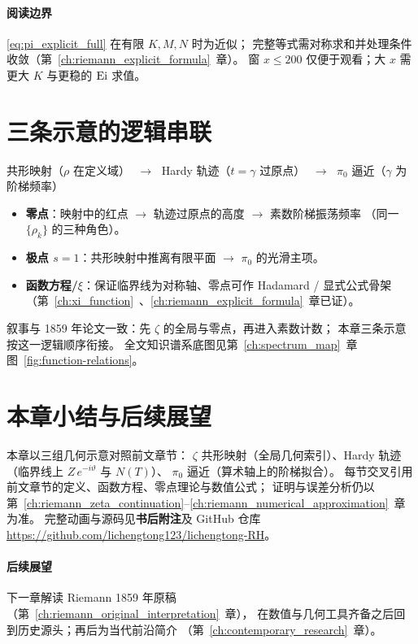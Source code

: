 \paragraph{阅读边界}
\eqref{eq:pi_explicit_full} 在有限 $K,M,N$ 时为近似；
完整等式需对称求和并处理条件收敛（第~\ref{ch:riemann_explicit_formula}~章）。
窗 $x\le 200$ 仅便于观看；大 $x$ 需更大 $K$ 与更稳的 $\operatorname{Ei}$ 求值。

\section{三条示意的逻辑串联}

\begin{center}
共形映射（$\rho$ 在定义域）
$\;\longrightarrow\;$
Hardy 轨迹（$t=\gamma$ 过原点）
$\;\longrightarrow\;$
$\pi_0$ 逼近（$\gamma$ 为阶梯频率）
\end{center}

\begin{itemize}
  \item \textbf{零点}：映射中的红点 $\to$ 轨迹过原点的高度 $\to$ 素数阶梯振荡频率
        （同一 $\{\rho_k\}$ 的三种角色）。
  \item \textbf{极点 $s=1$}：共形映射中推离有限平面 $\to$ $\pi_0$ 的光滑主项。
  \item \textbf{函数方程/$\xi$}：保证临界线为对称轴、零点可作 Hadamard / 显式公式骨架
        （第~\ref{ch:xi_function}~、\ref{ch:riemann_explicit_formula}~章已证）。
\end{itemize}
叙事与 1859 年论文一致：先 $\zeta$ 的全局与零点，再进入素数计数；
本章三条示意按这一逻辑顺序衔接。
全文知识谱系底图见第~\ref{ch:spectrum_map}~章图~\ref{fig:function-relations}。

\section*{本章小结与后续展望}

本章以三组几何示意对照前文章节：
$\zeta$ 共形映射（全局几何索引）、Hardy 轨迹（临界线上 $Z\,e^{-i\vartheta}$ 与 $N(T)$）、
$\pi_0$ 逼近（算术轴上的阶梯拟合）。
每节交叉引用前文章节的定义、函数方程、零点理论与数值公式；
证明与误差分析仍以第~\ref{ch:riemann_zeta_continuation}--\ref{ch:riemann_numerical_approximation}~章为准。
完整动画与源码见\textbf{书后附注}及 GitHub 仓库 \url{https://github.com/lichengtong123/lichengtong-RH}。

\paragraph{后续展望}
下一章解读 Riemann 1859 年原稿（第~\ref{ch:riemann_original_interpretation}~章），
在数值与几何工具齐备之后回到历史源头；再后为当代前沿简介
（第~\ref{ch:contemporary_research}~章）。
